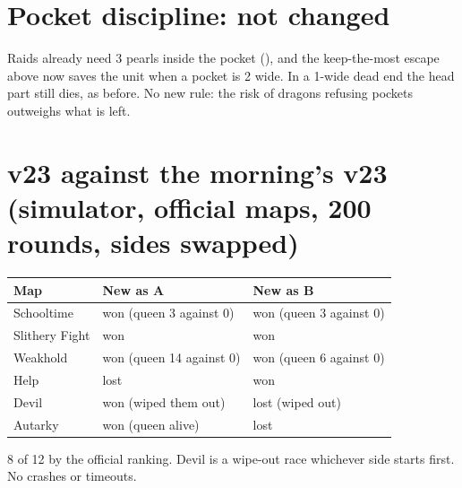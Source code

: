 \documentclass[11pt,a4paper]{article}
\newcommand{\code}[1]{\texttt{\detokenize{#1}}}
\begin{document}
\section{Pocket discipline: not changed}
Raids already need 3 pearls inside the pocket (\code{POCKET_MIN_PEARLS}), and the keep-the-most escape above now saves the unit
when a pocket is 2 wide. In a 1-wide dead end the head part still dies, as before. No new rule: the risk of dragons refusing pockets
outweighs what is left.

\section{v23 against the morning's v23 (simulator, official maps, 200 rounds, sides swapped)}
\begin{center}
\begin{tabular}{@{}lll@{}}
\toprule
Map & New as A & New as B \\
\midrule
Schooltime & won (queen 3 against 0) & won (queen 3 against 0) \\
Slithery Fight & won & won \\
Weakhold & won (queen 14 against 0) & won (queen 6 against 0) \\
Help & lost & won \\
Devil & won (wiped them out) & lost (wiped out) \\
Autarky & won (queen alive) & lost \\
\bottomrule
\end{tabular}
\end{center}
8 of 12 by the official ranking. Devil is a wipe-out race whichever side starts first. No crashes or timeouts.
\end{document}
